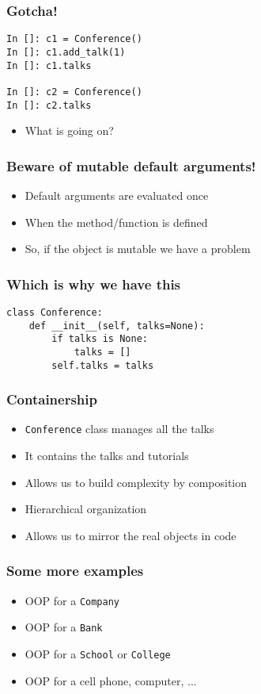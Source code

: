 \documentclass[14pt,compress,aspectratio=169]{beamer}
\begin{document}
\begin{frame}[fragile]
  \frametitle{Gotcha!}
\begin{lstlisting}
In []: c1 = Conference()
In []: c1.add_talk(1)
In []: c1.talks

In []: c2 = Conference()
In []: c2.talks

\end{lstlisting}

  \begin{itemize}
  \item What is going on?
  \end{itemize}
\end{frame}

\begin{frame}
  \frametitle{Beware of mutable default arguments!}
  \begin{itemize}
  \item Default arguments are evaluated once
  \item When the method/function is defined
  \item So, if the object is mutable we have a problem
  \end{itemize}
\end{frame}

\begin{frame}[fragile]
  \frametitle{Which is why we have this}
\begin{lstlisting}
class Conference:
    def __init__(self, talks=None):
        if talks is None:
            talks = []
        self.talks = talks
\end{lstlisting}
\end{frame}

\begin{frame}
  \frametitle{Containership}
  \begin{itemize}
  \item \lstinline{Conference} class manages all the talks
  \item It contains the talks and tutorials
  \item Allows us to build complexity by \alert{composition}
  \item Hierarchical organization
  \item Allows us to mirror the real objects in code
  \end{itemize}
\end{frame}

\begin{frame}
  \frametitle{Some more examples}
  \begin{itemize}
  \item OOP for a \lstinline{Company}
  \item OOP for a \lstinline{Bank}
  \item OOP for a \lstinline{School} or \lstinline{College}
  \item OOP for a cell phone, computer, ...
  \end{itemize}
\end{frame}
\end{document}
